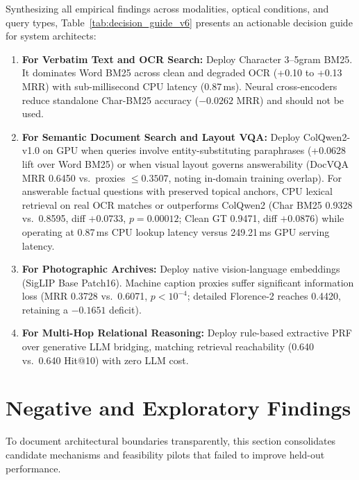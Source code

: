 Synthesizing all empirical findings across modalities, optical conditions, and query types, Table~\ref{tab:decision_guide_v6} presents an actionable decision guide for system architects:
\begin{enumerate}
    \setlength{\itemsep}{0.2pt plus 0.1pt}
    \setlength{\parskip}{0pt}
    \item \textbf{For Verbatim Text and OCR Search:} Deploy Character 3--5gram BM25. It dominates Word BM25 across clean and degraded OCR (+0.10 to +0.13 MRR) with sub-millisecond CPU latency (0.87\,ms). Neural cross-encoders reduce standalone Char-BM25 accuracy ($-0.0262$ MRR) and should not be used.
    \item \textbf{For Semantic Document Search and Layout VQA:} Deploy ColQwen2-v1.0 on GPU when queries involve entity-substituting paraphrases (+0.0628 lift over Word BM25) or when visual layout governs answerability (DocVQA MRR 0.6450 vs.\ proxies $\le 0.3507$, noting in-domain training overlap). For answerable factual questions with preserved topical anchors, CPU lexical retrieval on real OCR matches or outperforms ColQwen2 (Char BM25 0.9328 vs.\ 0.8595, diff $+0.0733$, $p = 0.00012$; Clean GT 0.9471, diff $+0.0876$) while operating at 0.87\,ms CPU lookup latency versus 249.21\,ms GPU serving latency.
    \item \textbf{For Photographic Archives:} Deploy native vision-language embeddings (SigLIP Base Patch16). Machine caption proxies suffer significant information loss (MRR 0.3728 vs.\ 0.6071, $p < 10^{-4}$; detailed Florence-2 reaches 0.4420, retaining a $-0.1651$ deficit).
    \item \textbf{For Multi-Hop Relational Reasoning:} Deploy rule-based extractive PRF over generative LLM bridging, matching retrieval reachability (0.640 vs.\ 0.640 Hit@10) with zero LLM cost.
\end{enumerate}

\section{Negative and Exploratory Findings}
\label{sec:negative_findings}

To document architectural boundaries transparently, this section consolidates candidate mechanisms and feasibility pilots that failed to improve held-out performance.


